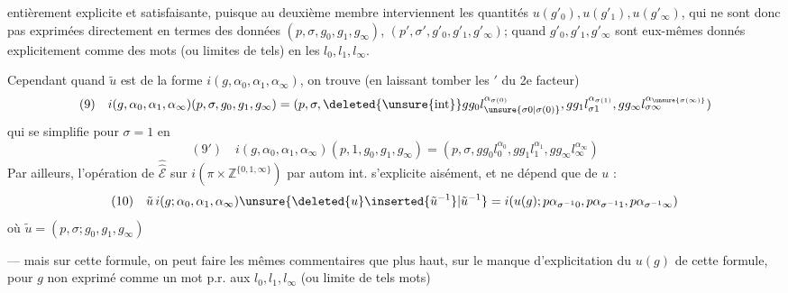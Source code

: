 entièrement explicite et satisfaisante, puisque au deuxième membre interviennent les quantités $u(g'_0),u(g'_1),u(g'_\infty)$, qui ne sont donc pas exprimées directement en termes des  données $(p,\sigma,g_0,g_1,g_\infty)$, $(p',\sigma',g'_0,g'_1,g'_\infty)$;  quand $g'_0,g'_1,g'_\infty$ sont eux-mêmes donnés explicitement comme des mots (ou limites de tels) en les $l_0,l_1,l_\infty$.

Cependant quand $\tilde u$ est de la forme $i(g,\alpha_0,\alpha_1,\alpha_\infty)$, on trouve (en laissant tomber les $'$ du 2e facteur)
\[
(9)\quad i(g,\alpha_0,\alpha_1,\alpha_\infty)(p,\sigma,g_0,g_1,g_\infty)=(p,\sigma,\deleted{\unsure{\operatorname{int}}}gg_0l_{\unsure{\sigma0|\sigma(0)}}^{\alpha_{\sigma(0)}},gg_1l_{\sigma1}^{\alpha_{\sigma(1)}},gg_\infty l_{\sigma\infty}^{\alpha_{\unsure{\sigma(\infty)}}})
\]
qui se simplifie pour $\sigma=1$ en
\[
(9')\quad i(g,\alpha_0,\alpha_1,\alpha_\infty)(p,1,g_0,g_1,g_\infty)=(p,\sigma,gg_0l_0^{\alpha_0},gg_1l_1^{\alpha_1},gg_\infty l_\infty^{\alpha_\infty})
\]
Par ailleurs, l'opération de $\widehat{\widehat{\mathcal E}}$ sur $i(\pi\times\mathbb Z^{\{0,1,\infty\}})$ par autom int. s'explicite aisément, et ne dépend que de $u$ :
\[
(10)\quad\tilde u\,i(g;\alpha_0,\alpha_1,\alpha_\infty)\unsure{\deleted{u}\inserted{\tilde u^{-1}}|\tilde u^{-1}}=i(u(g);p\alpha_{\sigma^{-1}0},p\alpha_{\sigma^{-1}1},p\alpha_{\sigma^{-1}\infty})
\]
où $\tilde u=(p,\sigma;g_0,g_1,g_\infty)$

--- mais sur cette formule, on peut faire les mêmes commentaires que plus haut, sur le manque d'explicitation du  $u(g)$ de cette formule, pour $g$ non exprimé comme un mot p.r. aux $l_0,l_1,l_\infty$ (ou limite de tels mots)
